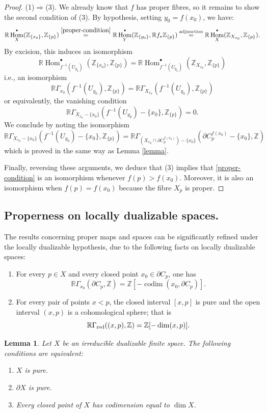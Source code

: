 \documentclass[amssymb,amscd,11pt,20pt]{amsart}
\newcommand{\codim}{{\operatorname{codim}}}
\newcommand{\ZZ}{{\mathbb Z}}
\newcommand{\RR}{\mathbb R}
\newcommand{\0}{\mathbf 0}
\DeclareMathOperator{\Hom}{{Hom}}
\newcommand{\pun}{{\scriptscriptstyle \bullet}}
\theoremstyle{plain}
\newtheorem{lem}[thm]{Lemma}
\numberwithin{equation}{thm}
\begin{document}
\begin{proof}
(1)$\Rightarrow$(3). We already know that $f$ has proper fibres, so it remains to show the second condition of (3).  By hypothesis, setting $y_0 = f(x_0)$, we have:
\[ \RR\Hom_X^\pun(\ZZ_{\{x_0\}} , \ZZ_{\{p\}}) \overset{\eqref{proper-condition}}= \RR\Hom^\pun_Y(\ZZ_{\{y_0\}} , \RR f_*\ZZ_{\{p\}}) \overset{\text{\rm adjunction}}= \RR\Hom_X^\pun (\ZZ_{X_{x_0}},\ZZ_{\{p\}}).\]  By excision, this induces an isomorphism
\[ \RR\Hom_{f^{-1}(U_{y_0})}^\pun(\ZZ_{\{x_0\}} , \ZZ_{\{p\}}) = \RR\Hom_{f^{-1}(U_{y_0})}^\pun (\ZZ_{X_{x_0}},\ZZ_{\{p\}})\] i.e., an isomorphism
\[ \RR\Gamma_{x_0}(f^{-1}(U_{y_0}), \ZZ_{\{p\}})= \RR\Gamma_{X_{x_0}}(f^{-1}(U_{y_0}), \ZZ_{\{p\}})\] or equivalently, the vanishing condition
\[ \RR\Gamma_{X_{x_0}-\{x_0\}}(f^{-1}(U_{y_0})-\{x_0\}, \ZZ_{\{p\}}) =0.\]
We conclude by noting  the isomorphism
\[ \RR\Gamma_{X_{x_0}-\{x_0\}}(f^{-1}(U_{y_0})-\{x_0\}, \ZZ_{\{p\}}) = \RR\Gamma_{(X_{x_0}\cap\partial C_p^{f(x_0)})-\{ x_0\}} (\partial C_p^{f(x_0)} -\{x_0\},\ZZ)\] which is proved in the same way as Lemma \ref{lemma}.

Finally, reversing these arguments, we deduce that (3) implies that \eqref{proper-condition} is an isomorphism whenever $f(p)>f(x_0)$. Moreover,  it is also an isomorphism when $f(p)=f(x_0)$ because the fibre $X_p$ is proper.
\end{proof}



\subsection{Properness on locally dualizable spaces.}\label{subsection-ld-properness}
\bigskip

The results concerning proper maps and spaces can be  significantly refined  under the locally dualizable hypothesis, due to the following facts on locally dualizable spaces:
\begin{enumerate} \item[(A)] For every $p\in X$  and every closed point $x_0\in\partial C_p$, one has
\[\RR\Gamma_{x_0}(\partial C_p,\ZZ)=\ZZ[-\codim (x_0,\partial C_p)].\]
\item[(B)] For every pair of points  $x<p$, the closed interval $[x,p]$ is pure and the open interval  $(x,p)$ is a cohomological sphere; that is \[\RR\Gamma_{\text{\rm red}}((x,p),\ZZ) = \ZZ[-\dim (x,p)].\]
\end{enumerate}

\begin{lem}\label{pure} Let $X$ be an irreducible dualizable finite space. The following conditions are equivalent:
\begin{enumerate}
\item $X$ is pure.
\item $\partial X$ is pure.
\item Every closed point of $X$ has codimension equal to $\dim X$.
\end{enumerate}
\end{lem}
\end{document}
